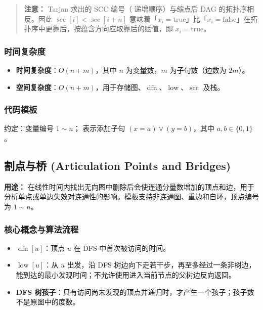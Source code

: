 \begin{quote}
\textbf{注意：} Tarjan 求出的 SCC 编号（ 递增顺序）与缩点后 DAG 的拓扑序相反。因此 $\operatorname{scc}[i] < \operatorname{scc}[i + n]$ 意味着「$x_i = \text{true}$」比「$x_i = \text{false}$」在拓扑序中更靠后，按蕴含方向应取靠后的赋值，即 $x_i = \text{true}$。
\end{quote}

\subsubsection{时间复杂度}

\begin{itemize}
  \item \textbf{时间复杂度}：$O(n + m)$，其中 $n$ 为变量数，$m$ 为子句数（边数为 $2m$）。
  \item \textbf{空间复杂度}：$O(n + m)$，用于存储图、$\operatorname{dfn}$、$\operatorname{low}$、$\operatorname{scc}$ 及栈。
\end{itemize}

\subsubsection{代码模板}

约定：变量编号 $1 \sim n$； 表示添加子句 $(x = a) \lor (y = b)$，其中 $a, b \in \{0, 1\}$。



\subsection{割点与桥 (Articulation Points and Bridges)}

\textbf{用途：} 在线性时间内找出无向图中删除后会使连通分量数增加的顶点和边，用于分析单点或单边失效对连通性的影响。模板支持非连通图、重边和自环，顶点编号为 $1 \sim n$。

\subsubsection{核心概念与算法流程}

\begin{itemize}
  \item $\operatorname{dfn}[u]$：顶点 $u$ 在 DFS 中首次被访问的时间。
  \item $\operatorname{low}[u]$：从 $u$ 出发，沿 DFS 树边向下走若干步，再至多经过一条非树边，能到达的最小发现时间；不允许使用进入当前节点的父树边反向返回。
  \item \textbf{DFS 树孩子}：只有访问尚未发现的顶点并递归时，才产生一个孩子；孩子数不是原图中的度数。
\end{itemize}

